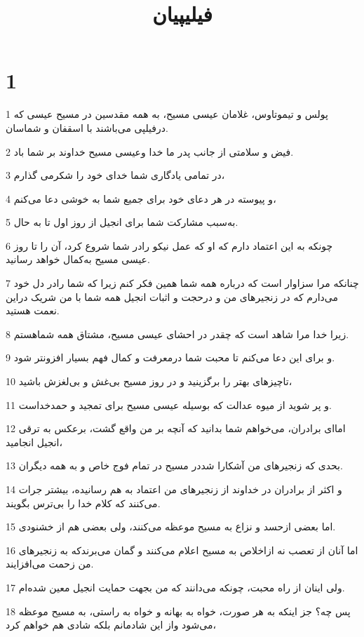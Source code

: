 

\title{فيليپيان}


\chapter{1}

\par 1 پولس و تیموتاوس، غلامان عیسی مسیح، به همه مقدسین در مسیح عیسی که درفیلپی می‌باشند با اسقفان و شماسان.
\par 2 فیض و سلامتی از جانب پدر ما خدا وعیسی مسیح خداوند بر شما باد.
\par 3 در تمامی یادگاری شما خدای خود را شکرمی گذارم،
\par 4 و پیوسته در هر دعای خود برای جمیع شما به خوشی دعا می‌کنم،
\par 5 به‌سبب مشارکت شما برای انجیل از روز اول تا به حال.
\par 6 چونکه به این اعتماد دارم که او که عمل نیکو رادر شما شروع کرد، آن را تا روز عیسی مسیح به‌کمال خواهد رسانید.
\par 7 چنانکه مرا سزاوار است که درباره همه شما همین فکر کنم زیرا که شما رادر دل خود می‌دارم که در زنجیرهای من و درحجت و اثبات انجیل همه شما با من شریک دراین نعمت هستید.
\par 8 زیرا خدا مرا شاهد است که چقدر در احشای عیسی مسیح، مشتاق همه شماهستم.
\par 9 و برای این دعا می‌کنم تا محبت شما درمعرفت و کمال فهم بسیار افزونتر شود.
\par 10 تاچیزهای بهتر را برگزینید و در روز مسیح بی‌غش و بی‌لغزش باشید،
\par 11 و پر شوید از میوه عدالت که بوسیله عیسی مسیح برای تمجید و حمدخداست.
\par 12 اما‌ای برادران، می‌خواهم شما بدانید که آنچه بر من واقع گشت، برعکس به ترقی انجیل انجامید،
\par 13 بحدی که زنجیرهای من آشکارا شددر مسیح در تمام فوج خاص و به همه دیگران.
\par 14 و اکثر از برادران در خداوند از زنجیرهای من اعتماد به هم رسانیده، بیشتر جرات می‌کنند که کلام خدا را بی‌ترس بگویند.
\par 15 اما بعضی ازحسد و نزاع به مسیح موعظه می‌کنند، ولی بعضی هم از خشنودی.
\par 16 اما آنان از تعصب نه ازاخلاص به مسیح اعلام می‌کنند و گمان می‌برندکه به زنجیرهای من زحمت می‌افزایند.
\par 17 ولی اینان از راه محبت، چونکه می‌دانند که من بجهت حمایت انجیل معین شده‌ام.
\par 18 پس چه؟ جز اینکه به هر صورت، خواه به بهانه و خواه به راستی، به مسیح موعظه می‌شود واز این شادمانم بلکه شادی هم خواهم کرد،
